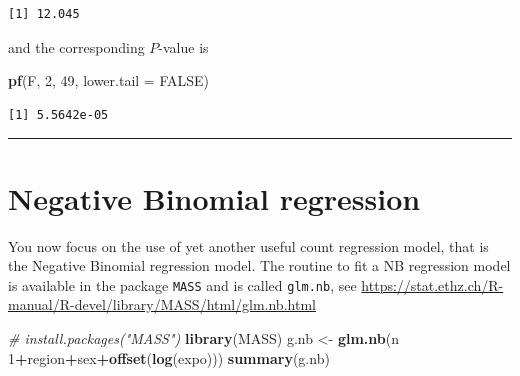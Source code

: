 \documentclass[
]{book}
\newenvironment{Shaded}{\begin{snugshade}}{\end{snugshade}}
\newcommand{\CommentTok}[1]{\textcolor[rgb]{0.56,0.35,0.01}{\textit{#1}}}
\newcommand{\DataTypeTok}[1]{\textcolor[rgb]{0.13,0.29,0.53}{#1}}
\newcommand{\DecValTok}[1]{\textcolor[rgb]{0.00,0.00,0.81}{#1}}
\newcommand{\KeywordTok}[1]{\textcolor[rgb]{0.13,0.29,0.53}{\textbf{#1}}}
\newcommand{\NormalTok}[1]{#1}
\newcommand{\OperatorTok}[1]{\textcolor[rgb]{0.81,0.36,0.00}{\textbf{#1}}}
\newcommand{\OtherTok}[1]{\textcolor[rgb]{0.56,0.35,0.01}{#1}}
\newcommand{\StringTok}[1]{\textcolor[rgb]{0.31,0.60,0.02}{#1}}
\begin{document}
\begin{verbatim}
[1] 12.045
\end{verbatim}

and the corresponding \(P\)-value is

\begin{Shaded}
\begin{Highlighting}[]
\KeywordTok{pf}\NormalTok{(F, }\DecValTok{2}\NormalTok{, }\DecValTok{49}\NormalTok{, }\DataTypeTok{lower.tail =} \OtherTok{FALSE}\NormalTok{)}
\end{Highlighting}
\end{Shaded}

\begin{verbatim}
[1] 5.5642e-05
\end{verbatim}

\begin{center}\rule{0.5\linewidth}{0.5pt}\end{center}

\hypertarget{negative-binomial-regression}{%
\section{Negative Binomial regression}\label{negative-binomial-regression}}

You now focus on the use of yet another useful count regression model, that is the Negative Binomial regression model. The routine to fit a NB regression model is available in the package \texttt{MASS} and is called \texttt{glm.nb}, see \url{https://stat.ethz.ch/R-manual/R-devel/library/MASS/html/glm.nb.html}

\begin{Shaded}
\begin{Highlighting}[]
\CommentTok{# install.packages("MASS")}
\KeywordTok{library}\NormalTok{(MASS)}
\NormalTok{g.nb <-}\StringTok{ }\KeywordTok{glm.nb}\NormalTok{(n }\OperatorTok{~}\StringTok{ }\DecValTok{1}\OperatorTok{+}\NormalTok{region}\OperatorTok{+}\NormalTok{sex}\OperatorTok{+}\KeywordTok{offset}\NormalTok{(}\KeywordTok{log}\NormalTok{(expo)))}
\KeywordTok{summary}\NormalTok{(g.nb)}
\end{Highlighting}
\end{Shaded}
\end{document}
